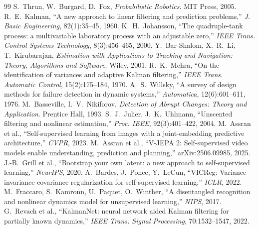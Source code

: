 \documentclass[11pt]{article}
\begin{document}
\begin{thebibliography}{99}\small
{} S.~Thrun, W.~Burgard, D.~Fox, \emph{Probabilistic Robotics}. MIT Press, 2005.
 R.~E.~Kalman, ``A new approach to linear filtering and prediction problems,'' \emph{J. Basic Engineering}, 82(1):35--45, 1960.
 K.~H.~Johansson, ``The quadruple-tank process: a multivariable laboratory process with an adjustable zero,'' \emph{IEEE Trans. Control Systems Technology}, 8(3):456--465, 2000.
 Y.~Bar-Shalom, X.~R.~Li, T.~Kirubarajan, \emph{Estimation with Applications to Tracking and Navigation: Theory, Algorithms and Software}. Wiley, 2001.
 R.~K.~Mehra, ``On the identification of variances and adaptive Kalman filtering,'' \emph{IEEE Trans. Automatic Control}, 15(2):175--184, 1970.
 A.~S.~Willsky, ``A survey of design methods for failure detection in dynamic systems,'' \emph{Automatica}, 12(6):601--611, 1976.
 M.~Basseville, I.~V.~Nikiforov, \emph{Detection of Abrupt Changes: Theory and Application}. Prentice Hall, 1993.
 S.~J.~Julier, J.~K.~Uhlmann, ``Unscented filtering and nonlinear estimation,'' \emph{Proc. IEEE}, 92(3):401--422, 2004.
 M.~Assran et al., ``Self-supervised learning from images with a joint-embedding predictive architecture,'' \emph{CVPR}, 2023.
 M.~Assran et al., ``V-JEPA 2: Self-supervised video models enable understanding, prediction and planning,'' arXiv:2506.09985, 2025.
 J.-B.~Grill et al., ``Bootstrap your own latent: a new approach to self-supervised learning,'' \emph{NeurIPS}, 2020.
 A.~Bardes, J.~Ponce, Y.~LeCun, ``VICReg: Variance-invariance-covariance regularization for self-supervised learning,'' \emph{ICLR}, 2022.
 M.~Fraccaro, S.~Kamronn, U.~Paquet, O.~Winther, ``A disentangled recognition and nonlinear dynamics model for unsupervised learning,'' \emph{NIPS}, 2017.
 G.~Revach et al., ``KalmanNet: neural network aided Kalman filtering for partially known dynamics,'' \emph{IEEE Trans. Signal Processing}, 70:1532--1547, 2022.
\end{thebibliography}
\end{document}
